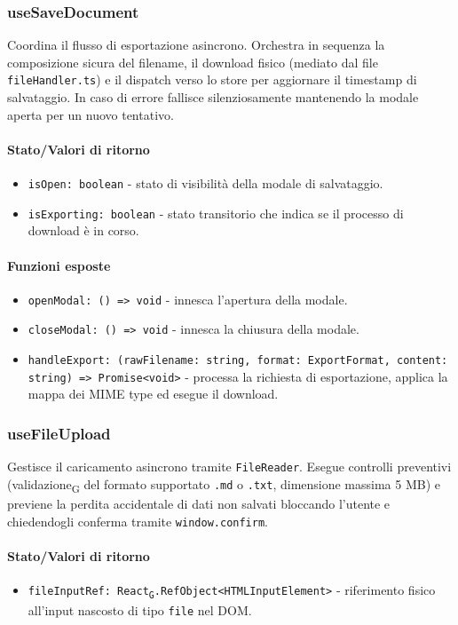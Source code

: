 \documentclass[11pt,a4paper]{article}
\newcommand{\gls}[1]{#1\textsubscript{G}}
\begin{document}
\subsubsection{useSaveDocument}
Coordina il flusso di esportazione asincrono. Orchestra in sequenza la composizione sicura del filename, il download fisico (mediato dal file \texttt{fileHandler.ts}) e il dispatch verso lo store per aggiornare il timestamp di salvataggio. In caso di errore fallisce silenziosamente mantenendo la modale aperta per un nuovo tentativo.

\paragraph{Stato/Valori di ritorno}
\begin{itemize}
    \item \texttt{isOpen: boolean} - stato di visibilità della modale di salvataggio.
    \item \texttt{isExporting: boolean} - stato transitorio che indica se il processo di download è in corso.
\end{itemize}

\paragraph{Funzioni esposte}
\begin{itemize}
    \item \texttt{openModal: () => void} - innesca l'apertura della modale.
    \item \texttt{closeModal: () => void} - innesca la chiusura della modale.
    \item \texttt{handleExport: (rawFilename: string, format: ExportFormat, content: string) => Promise<void>} - processa la richiesta di esportazione, applica la mappa dei MIME type ed esegue il download.
\end{itemize}

\subsubsection{useFileUpload}
Gestisce il caricamento asincrono tramite \texttt{FileReader}. Esegue controlli preventivi (\gls{validazione} del formato supportato \texttt{.md} o \texttt{.txt}, dimensione massima 5 MB) e previene la perdita accidentale di dati non salvati bloccando l'utente e chiedendogli conferma tramite \texttt{window.confirm}.

\paragraph{Stato/Valori di ritorno}
\begin{itemize}
    \item \texttt{fileInputRef: \gls{React}.RefObject<HTMLInputElement>} - riferimento fisico all'input nascosto di tipo \texttt{file} nel DOM.
\end{itemize}
\end{document}
